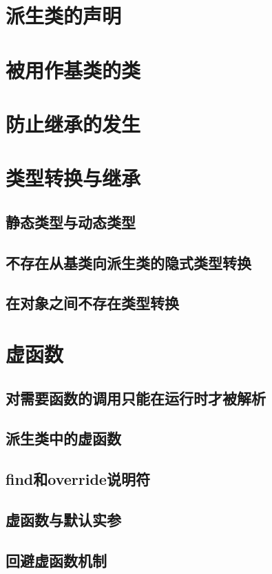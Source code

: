\section{派生类的声明}

\section{被用作基类的类}

\section{防止继承的发生}

\section{类型转换与继承}
\subsection{静态类型与动态类型}
\subsection{不存在从基类向派生类的隐式类型转换}
\subsection{在对象之间不存在类型转换}

\section{虚函数}
\subsection{对需要函数的调用只能在运行时才被解析}
\subsection{派生类中的虚函数}
\subsection{find和override说明符}
\subsection{虚函数与默认实参}
\subsection{回避虚函数机制}


